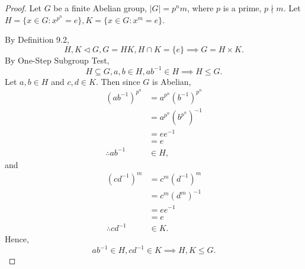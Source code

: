 \documentclass{article}
\newtheorem{lemma}{Lemma}[section]
\theoremstyle{definition}
\begin{document}
    \noindent{}
    
    \begin{proof}
       Let $G$ be a finite Abelian group, $|G|=p^nm$, where $p$ is a prime, $p\nmid m$. Let $H=\{x\in G: x^{p^n}=e\},K=\{x\in G: x^m=e\}$.
       
       By Definition 9.2,
       \begin{equation*}
           H,K \lhd G, G=HK, H\cap K=\{e\} \implies G=H\times K.
       \end{equation*} 
       By One-Step Subgroup Test,
       \begin{equation*}
           H \subseteq G, a,b\in H, ab^{-1} \in H \implies H \leq G.
       \end{equation*}
       Let $a,b\in H$ and $c,d\in K$. Then since $G$ is Abelian,
       \begin{align*}
           (ab^{-1})^{p^n} &= a^{p^n}(b^{-1})^{p^n} \\
           &= a^{p^n}(b^{p^n})^{-1} \\
           &= ee^{-1} \\
           &= e \\
           \therefore ab^{-1} &\in H,
       \end{align*}
       and
       \begin{align*}
           (cd^{-1})^m &= c^m(d^{-1})^m \\
           &= c^m(d^m)^{-1} \\
           &= ee^{-1} \\
           &= e \\
           \therefore cd^{-1} &\in K.
       \end{align*}
       Hence,
       \begin{equation*}
           ab^{-1}\in H, cd^{-1} \in K \implies H,K \leq G.
       \end{equation*}
       

\end{proof}
\end{document}
